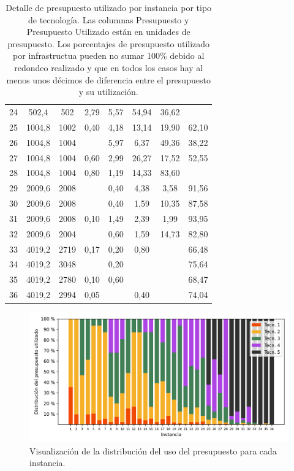 \documentclass{article}
\begin{document}
\begin{table}
\begin{tabular}{cccccccc}
        24 & 502,4 & 502 & 2,79 & 5,57 & 54,94 & 36,62 &  \\
        25 & 1004,8 & 1002 & 0,40 & 4,18 & 13,14 & 19,90 & 62,10 \\
        26 & 1004,8 & 1004 &  & 5,97 & 6,37 & 49,36 & 38,22 \\
        27 & 1004,8 & 1004 & 0,60 & 2,99 & 26,27 & 17,52 & 52,55 \\
        28 & 1004,8 & 1004 & 0,80 & 1,19 & 14,33 & 83,60 &  \\
        29 & 2009,6 & 2008 &  & 0,40 & 4,38 & 3,58 & 91,56 \\
        30 & 2009,6 & 2008 &  & 0,40 & 1,59 & 10,35 & 87,58 \\
        31 & 2009,6 & 2008 & 0,10 & 1,49 & 2,39 & 1,99 & 93,95 \\
        32 & 2009,6 & 2004 &  & 0,60 & 1,59 & 14,73 & 82,80 \\
        33 & 4019,2 & 2719 & 0,17 & 0,20 & 0,80 &  & 66,48 \\
        34 & 4019,2 & 3048 &  & 0,20 &  &  & 75,64 \\
        35 & 4019,2 & 2780 & 0,10 & 0,60 &  &  & 68,47 \\
        36 & 4019,2 & 2994 & 0,05 &  & 0,40 &  & 74,04 \\
        \bottomrule
    \end{tabular}
    \caption{Detalle de presupuesto utilizado por instancia por tipo de tecnología. Las columnas Presupuesto y Presupuesto Utilizado están en unidades de presupuesto. Los porcentajes de presupuesto utilizado por infrastructua pueden no sumar 100\% debido al redondeo realizado y que en todos los casos hay al menos unos décimos de diferencia entre el presupuesto y su utilización.} \label{table:sensibilitybudgetusage}
  \end{table}

  \begin{figure}[h!]
    \centering
    \includegraphics[width=12cm]{../resources/budget_use_by_infra.png}
    \caption{Visualización de la distribución del uso del presupuesto para cada instancia.}
    \label{fig:sensibilitybudgetusage}
  \end{figure}
\end{document}

